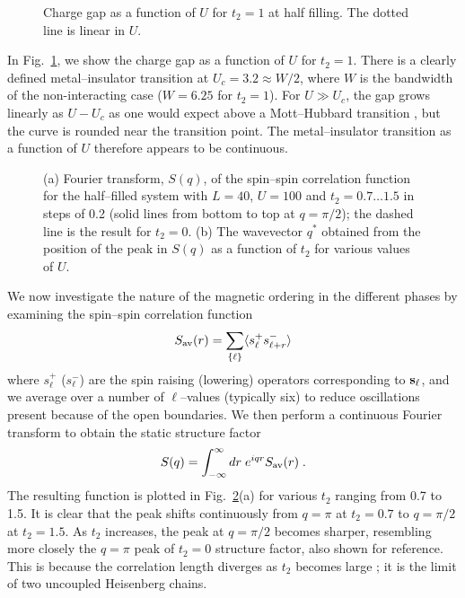 \begin{figure}[htb]
\begin{center}
\end{center}
\caption{Charge gap as a function of $U$ for $t_2=1$ at half filling.
The dotted line is linear in $U$. 
}
\label{ChargeGap}
\end{figure}

In Fig.\ \ref{ChargeGap}, we show the charge gap as a function of $U$ for 
$t_2=1$. 
There is a clearly defined metal--insulator transition at 
$U_c = 3.2 \approx W/2$, where $W$ is the bandwidth of the
non-interacting case ($W=6.25$ for $t_2=1$).
For $U \gg U_c$, the gap grows linearly as $U-U_c$ as one would expect
above a Mott--Hubbard transition \cite{motthubbard}, but the curve is
rounded near the transition point.
The metal--insulator transition as a function of $U$ therefore appears to be 
continuous. 

\begin{figure}[htb]
\begin{center}
\end{center}
\caption{(a) Fourier transform, $S(q)$, of the spin--spin correlation
function for the half--filled system with $L=40$, $U=100$ and 
$t_2 = 0.7 \ldots 1.5$ in steps of 0.2 (solid lines from bottom to top at
$q=\pi/2$); the dashed line is the result for $t_2=0$. (b) The wavevector 
$q^\ast$ obtained from the position of the peak in $S(q)$ as a 
function of $t_2$ for various values of $U$.}
\label{SpinCorrelationFunction}
\end{figure}

We now investigate the nature of the magnetic ordering in the different phases
by examining the spin--spin correlation function
\begin{equation}
 S_{\rm av}(r) = \sum_{\{\ell\}}\langle s_\ell^+s_{\ell+r}^-\rangle
\end{equation}
where $s_\ell^+$ ($s_\ell^-$) are the spin raising (lowering) operators
corresponding to ${\bf s}_\ell$, and 
we average over a number of $\ell$--values (typically six) to
reduce oscillations present because of the open boundaries.
We then perform a continuous Fourier transform to obtain the static
structure factor
\begin{equation}
   S(q) = \int_{-\infty}^\infty 
   dr \; e^{iqr} S_{\rm av}(r) \; .
\end{equation}
The resulting function is plotted in
Fig.\ \ref{SpinCorrelationFunction}(a) for various $t_2$ ranging from
0.7 to 1.5.
It is clear that the peak shifts continuously from $q=\pi$ at $t_2=0.7$
to $q=\pi/2$ at $t_2=1.5$. 
As $t_2$ increases, the peak at $q= \pi/2$ becomes sharper, resembling
more closely the $q=\pi$ peak of $t_2=0$ structure factor, also shown
for reference.
This is because the correlation length diverges as $t_2$ becomes
large \cite{WhiteAffleck}; it is the limit of two
uncoupled Heisenberg chains.

